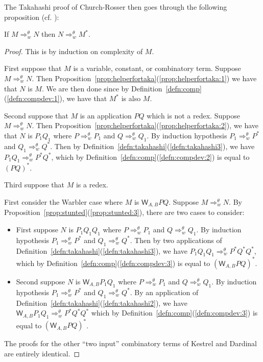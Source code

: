 \documentclass{lmcs} %
\newcommand{\param}{\theta}
\newcommand{\Reduces}[2]{\Rightarrow_{#1}^{#2}}
\newcommand{\ctW}[4]{{\mathsf W}_{#1, #2}#3#4}
\begin{document}
The Takahashi proof of Church-Rosser then goes through the following proposition (cf. \cite[p. 121]{Takahashi1995-kp}):
\begin{prop}\label{prop:Takahashiprop}

If $M\Reduces{w}{\param} N$ then $N\Reduces{w}{\param} M^{\ast}$.

\end{prop}
\begin{proof}

This is by induction on complexity of $M$.

First suppose that $M$ is a variable, constant, or combinatory term. Suppose $M\Reduces{w}{\param} N$. Then Proposition~\ref{prop:helperfortaka}(\ref{prop:helperfortaka:1}) we have that $N$ is $M$. We are then done since by Definition~\ref{defn:comp}(\ref{defn:compdev:1}), we have that $M^{\ast}$ is also $M$.

Second suppose that $M$ is an application $PQ$ which is not a redex. Suppose $M\Reduces{w}{\param} N$. Then Proposition~\ref{prop:helperfortaka}(\ref{prop:helperfortaka:2}), we have that $N$ is $P_1 Q_1$ where $P\Reduces{w}{\param} P_1$ and $Q\Reduces{w}{\param} Q_1$. By induction hypothesis
$P_1\Reduces{w}{\param} P^{\ast}$ and $Q_1\Reduces{w}{\param} Q^{\ast}$. Then by Definition~\ref{defn:takahashi}(\ref{defn:takahashi3}), we have $P_1Q_1\Reduces{w}{\param} P^{\ast} Q^{\ast}$, which by Definition~\ref{defn:comp}(\ref{defn:compdev:2}) is equal to $(PQ)^{\ast}$.

 Third suppose that $M$ is a redex. 
 
 First consider the Warbler case where $M$ is $\ctW{A}{B}{P}{Q}$.  Suppose $M\Reduces{w}{\param} N$. By Proposition~\ref{prop:stunted}(\ref{prop:stunted:3}), there are two cases to consider:
 \begin{itemize}[leftmargin=*]
 \item First suppose $N$ is $P_1 Q_1 Q_1$ where $P\Reduces{w}{\param} P_1$ and $Q\Reduces{w}{\param} Q_1$. By induction hypothesis  
$P_1\Reduces{w}{\param} P^{\ast}$ and $Q_1\Reduces{w}{\param} Q^{\ast}$. Then by two applications of Definition~\ref{defn:takahashi}(\ref{defn:takahashi3}), we have $P_1Q_1Q_1\Reduces{w}{\param} P^{\ast} Q^{\ast} Q^{\ast}$, which by Definition~\ref{defn:comp}(\ref{defn:compdev:3}) is equal to $(\ctW{A}{B}{P}{Q})^{\ast}$.
\item Second suppose $N$ is $\ctW{A}{B}{P_1}{Q_1}$ where $P\Reduces{w}{\param} P_1$ and $Q\Reduces{w}{\param} Q_1$. By induction hypothesis 
$P_1\Reduces{w}{\param} P^{\ast}$ and $Q_1\Reduces{w}{\param} Q^{\ast}$. By an application of Definition~\ref{defn:takahashi}(\ref{defn:takahashi2}), we have $\ctW{A}{B}{P_1}{Q_1}\Reduces{w}{\param}  P^{\ast} Q^{\ast} Q^{\ast}$ which by Definition~\ref{defn:comp}(\ref{defn:compdev:3}) is equal to $(\ctW{A}{B}{P}{Q})^{\ast}$.
\end{itemize}
The proofs for the other ``two input'' combinatory terms of Kestrel and Dardinal are entirely identical.


\end{proof}
\end{document}
